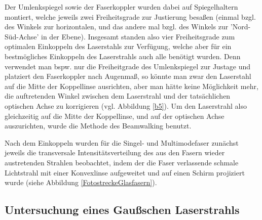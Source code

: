 \documentclass[11pt,a4paper,oneside]{scrartcl}
\begin{document}
Der
Umlenkspiegel sowie der Faserkoppler wurden dabei auf Spiegelhaltern montiert, welche jeweils zwei Freiheitsgrade zur Justierung besaßen (einmal bzgl. des Winkels zur horizontalen, und das andere mal bzgl.
des Winkels zur 'Nord-Süd-Achse' in der Ebene). Insgesamt standen also vier Freiheitsgrade zum optimalen Einkoppeln des Laserstahls zur Verfügung, welche aber für ein bestmögliches Einkoppeln des Laserstrahls
auch alle benötigt wurden. Denn verwendet man bspw. nur die Freiheitgrade des Umlenkspiegel zur Justage und platziert den Faserkoppler \glqq nach Augenmaß\grqq, so könnte man zwar den Laserstahl auf die Mitte
der Koppellinse ausrichten, aber man hätte keine Möglichkeit mehr, die auftretenden Winkel zwischen dem Laserstrahl und der tatsächlichen optischen Achse zu korrigieren (vgl. Abbildung \ref{b5}).
 Um den
Laserstrahl also gleichzeitig auf die Mitte der Koppellinse, und auf der optischen Achse auszurichten, wurde die Methode des Beamwalking benutzt.

Nach dem Einkoppeln wurden für die Singel- und Multimodefaser zunächst jeweils die transversale Intensitätsverteilung des aus den Fasern wieder austretenden Strahlen beobachtet, indem der die Faser verlassende schmale Lichtstrahl mit einer Konvexlinse aufgeweitet und auf einen Schirm projiziert wurde (siehe Abbildung \ref{FotostreckeGlasfasern}). 
\subsection{Untersuchung eines Gaußschen Laserstrahls}
\end{document}
